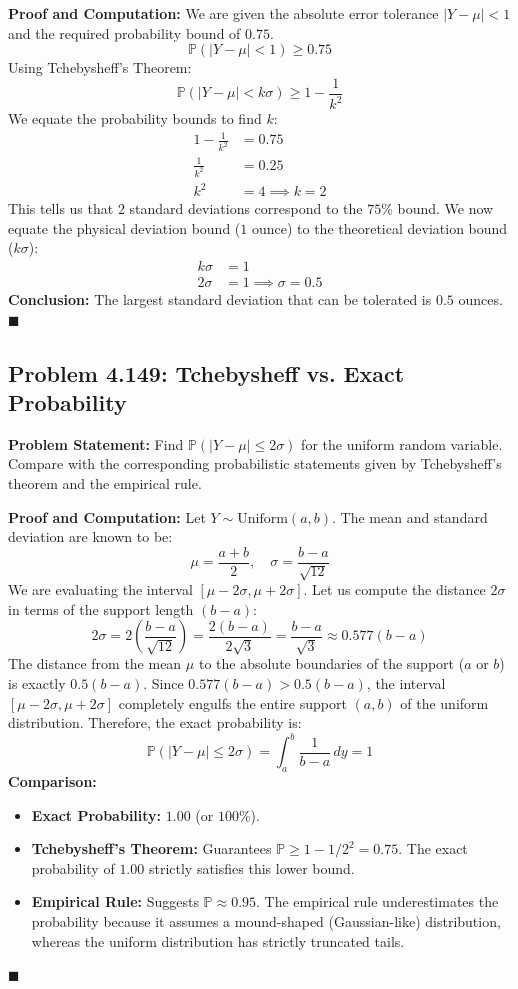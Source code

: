 \documentclass[11pt, a4paper]{article}
\theoremstyle{definition}
\theoremstyle{remark}
\newcommand{\Prob}{\mathbb{P}}
\begin{document}
\textbf{Proof and Computation:}
We are given the absolute error tolerance $|Y - \mu| < 1$ and the required probability bound of $0.75$.
\[ \Prob(|Y - \mu| < 1) \ge 0.75 \]
Using Tchebysheff's Theorem:
\[ \Prob(|Y - \mu| < k\sigma) \ge 1 - \frac{1}{k^2} \]
We equate the probability bounds to find $k$:
\begin{align*}
1 - \frac{1}{k^2} &= 0.75 \\
\frac{1}{k^2} &= 0.25 \\
k^2 &= 4 \implies k = 2
\end{align*}
This tells us that $2$ standard deviations correspond to the $75\%$ bound. We now equate the physical deviation bound ($1$ ounce) to the theoretical deviation bound ($k\sigma$):
\begin{align*}
k\sigma &= 1 \\
2\sigma &= 1 \implies \sigma = 0.5
\end{align*}
\textbf{Conclusion:} The largest standard deviation that can be tolerated is $0.5$ ounces. $\blacksquare$

\subsection{Problem 4.149: Tchebysheff vs. Exact Probability}
\textbf{Problem Statement:} Find $\Prob(|Y - \mu| \le 2\sigma)$ for the uniform random variable. Compare with the corresponding probabilistic statements given by Tchebysheff's theorem and the empirical rule.

\textbf{Proof and Computation:}
Let $Y \sim \text{Uniform}(a, b)$. The mean and standard deviation are known to be:
\[ \mu = \frac{a+b}{2}, \quad \sigma = \frac{b-a}{\sqrt{12}} \]
We are evaluating the interval $[\mu - 2\sigma, \mu + 2\sigma]$. Let us compute the distance $2\sigma$ in terms of the support length $(b-a)$:
\[ 2\sigma = 2 \left( \frac{b-a}{\sqrt{12}} \right) = \frac{2(b-a)}{2\sqrt{3}} = \frac{b-a}{\sqrt{3}} \approx 0.577(b-a) \]
The distance from the mean $\mu$ to the absolute boundaries of the support ($a$ or $b$) is exactly $0.5(b-a)$. Since $0.577(b-a) > 0.5(b-a)$, the interval $[\mu - 2\sigma, \mu + 2\sigma]$ completely engulfs the entire support $(a, b)$ of the uniform distribution.
Therefore, the exact probability is:
\[ \Prob(|Y - \mu| \le 2\sigma) = \int_{a}^{b} \frac{1}{b-a} \, dy = 1 \]
\textbf{Comparison:}
\begin{itemize}
    \item \textbf{Exact Probability:} $1.00$ (or $100\%$).
    \item \textbf{Tchebysheff's Theorem:} Guarantees $\Prob \ge 1 - 1/2^2 = 0.75$. The exact probability of $1.00$ strictly satisfies this lower bound.
    \item \textbf{Empirical Rule:} Suggests $\Prob \approx 0.95$. The empirical rule underestimates the probability because it assumes a mound-shaped (Gaussian-like) distribution, whereas the uniform distribution has strictly truncated tails.
\end{itemize}
$\blacksquare$
\end{document}
